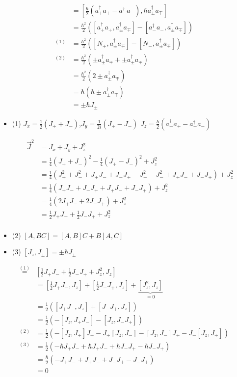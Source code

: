 \begin{align}
 [J_z,J_\pm]&=  [\frac{\hbar}{2}( a^\dagger_+ a_+-a^\dagger_- a_-), \hbar a^\dagger_\pm a_\mp] \\
&= \frac{\hbar^2}{2} \left( [a^\dagger_+ a_+,a^\dagger_\pm a_\mp]-[a^\dagger_- a_-,a^\dagger_\pm a_\mp]  \right) \\
^{(1)}&= \frac{\hbar^2}{2} \left( [N_+,a^\dagger_\pm a_\mp]-[N_-,a^\dagger_\pm a_\mp]  \right) \\
^{(2)}&= \frac{\hbar^2}{2} \left( \pm a^\dagger_\pm a_\mp +  \pm a^\dagger_\pm a_\mp  \right) \\
&= \frac{\hbar^2}{2} \left( 2 \pm a^\dagger_\pm a_\mp \right) \\
&= \hbar \left( \hbar \pm a^\dagger_\pm a_\mp \right) \\
&= \pm \hbar J_\pm
\end{align}


\begin{itemize}
\item (1) \(J_x=\frac{1}{2}(J_++J_-)\),\(J_y=\frac{1}{2i}(J_+-J_-)\)  \(J_z=\frac{\hbar}{2}( a^\dagger_+ a_+-a^\dagger_- a_-)\)

 \begin{align} \vec J^2 &= J_x+J_y+J^2_z \\
&= \frac{1}{4}(J_++J_-)^2-\frac{1}{4}(J_+-J_-)^2+J^2_z \\
&= \frac{1}{4}(J^2_++J^2_-+J_+J_-+J_-J_+-J^2_+-J^2_-+J_+J_-+J_-J_+) + J^2_z \\
&= \frac{1}{4}(J_+J_-+J_-J_++J_+J_-+J_-J_+) + J^2_z \\
&= \frac{1}{4}(2J_+J_-+2J_-J_+) + J^2_z \\
&= \frac{1}{2}J_+J_-+  \frac{1}{2}J_-J_+ + J^2_z \\
\end{align}
\item (2) \([A,BC]=[A,B]C+B[A,C]\)
\item (3) \([J_z,J_\pm] = \pm \hbar J_\pm\)
\end{itemize}

\begin{align}
[\vec J^2,J_z]\stackrel{\mathrm{(1)}}=&[\frac{1}{2}J_+J_-+  \frac{1}{2}J_-J_+ + J^2_z,J_z] \\
&=[\frac{1}{2}J_+J_-,J_z] +  [\frac{1}{2}J_-J_+,J_z] + \underbrace{[J^2_z,J_z]}_{=0} \\
&=\frac{1}{2} ([J_+J_-,J_z] + [J_-J_+,J_z]) \\
&=\frac{1}{2} (-[J_z,J_+J_-] - [J_z,J_-J_+]) \\
^{(2)}&=\frac{1}{2} (-[J_z,J_+]J_--J_+[J_z,J_-] - [J_z,J_-]J_+- J_-[J_z,J_+]) \\
^{(3)}&=\frac{1}{2} (-\hbar J_+J_-+\hbar J_+J_- + \hbar J_-J_+- \hbar J_-J_+) \\
&=\frac{\hbar}{2} (-J_+J_-+ J_+J_- +J_-J_+- J_-J_+) \\
&=0 
\end{align}

